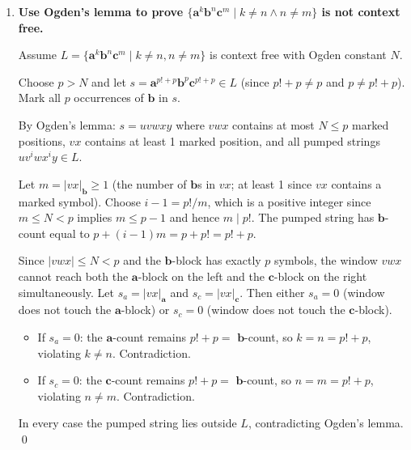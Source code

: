 \begin{enumerate}[{9.}1. ]
\item \textbf{Use Ogden's lemma to prove $\{\pmb{a}^k\pmb{b}^n\pmb{c}^m \mid k\neq n \wedge n\neq m\}$ is not context free.}

Assume $L = \{\pmb{a}^k\pmb{b}^n\pmb{c}^m \mid k\neq n, n\neq m\}$ is context free with Ogden constant $N$.

Choose $p > N$ and let $s = \pmb{a}^{p!+p}\pmb{b}^p\pmb{c}^{p!+p} \in L$ (since $p!+p \neq p$ and $p \neq p!+p$). Mark all $p$ occurrences of $\pmb{b}$ in $s$.

By Ogden's lemma: $s = uvwxy$ where $vwx$ contains at most $N \leq p$ marked positions, $vx$ contains at least 1 marked position, and all pumped strings $uv^i wx^i y \in L$.

Let $m = |vx|_{\pmb{b}} \geq 1$ (the number of $\pmb{b}$s in $vx$; at least 1 since $vx$ contains a marked symbol). Choose $i - 1 = p!/m$, which is a positive integer since $m \leq N < p$ implies $m \leq p-1$ and hence $m \mid p!$. The pumped string has $\pmb{b}$-count equal to $p + (i-1)m = p + p! = p!+p$.

Since $|vwx| \leq N < p$ and the $\pmb{b}$-block has exactly $p$ symbols, the window $vwx$ cannot reach both the $\pmb{a}$-block on the left and the $\pmb{c}$-block on the right simultaneously. Let $s_a = |vx|_{\pmb{a}}$ and $s_c = |vx|_{\pmb{c}}$. Then either $s_a = 0$ (window does not touch the $\pmb{a}$-block) or $s_c = 0$ (window does not touch the $\pmb{c}$-block).

\begin{itemize}
\item If $s_a = 0$: the $\pmb{a}$-count remains $p!+p = $ $\pmb{b}$-count, so $k = n = p!+p$, violating $k \neq n$. Contradiction.
\item If $s_c = 0$: the $\pmb{c}$-count remains $p!+p = $ $\pmb{b}$-count, so $n = m = p!+p$, violating $n \neq m$. Contradiction.
\end{itemize}

In every case the pumped string lies outside $L$, contradicting Ogden's lemma. \qed

\end{enumerate}
